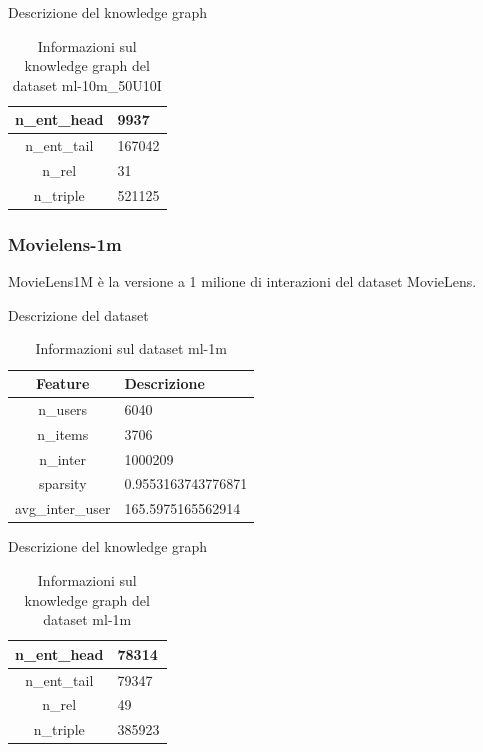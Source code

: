 \noindent Descrizione del knowledge graph
\begin{table}[H]
    \centering
    \footnotesize
    \begin{tabularx}{\textwidth}{|c|X|}
        \hline
        n\_ent\_head & 9937 \\
        \hline
        n\_ent\_tail & 167042 \\
        \hline
        n\_rel & 31 \\
        \hline
        n\_triple & 521125 \\
        \hline
    \end{tabularx}
    \caption{Informazioni sul knowledge graph del dataset ml-10m\_50U10I}
    \label{tab:dataset_info}
\end{table}


\subsubsection{Movielens-1m}

\noindent MovieLens1M è la versione a 1 milione di interazioni del dataset MovieLens.

\noindent Descrizione del dataset
\begin{table}[H]
    \centering
    \footnotesize
    \begin{tabularx}{\textwidth}{|c|X|}
        \hline
        \textbf{Feature} & \textbf{Descrizione} \\
        \hline
        n\_users & 6040 \\
        \hline
        n\_items & 3706 \\
        \hline
        n\_inter & 1000209 \\
        \hline
        sparsity & 0.9553163743776871 \\
        \hline
        avg\_inter\_user & 165.5975165562914 \\
        \hline
    \end{tabularx}
    \caption{Informazioni sul dataset ml-1m}
    \label{tab:dataset_info}
\end{table}

\noindent Descrizione del knowledge graph
\begin{table}[H]
    \centering
    \footnotesize
    \begin{tabularx}{\textwidth}{|c|X|}
        \hline
        n\_ent\_head & 78314 \\
        \hline
        n\_ent\_tail & 79347 \\
        \hline
        n\_rel & 49 \\
        \hline
        n\_triple & 385923 \\
        \hline
    \end{tabularx}
    \caption{Informazioni sul knowledge graph del dataset ml-1m}
    \label{tab:dataset_info}
\end{table}


